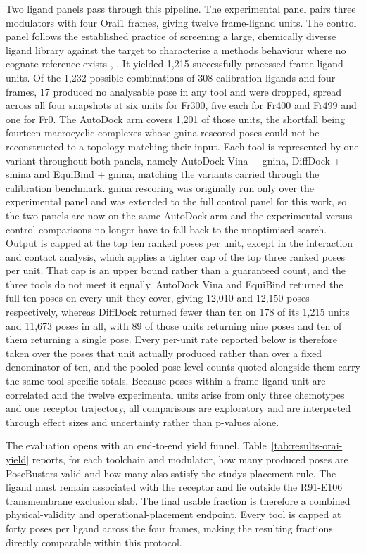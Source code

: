 Two ligand panels pass through this pipeline. The experimental panel pairs three modulators with four Orai1 frames, giving twelve frame-ligand units. The control panel follows the established practice of screening a large, chemically diverse ligand library against the target to characterise a method\textquotesingle s behaviour where no cognate reference exists \cite{ref045}, \cite{ref046}. It yielded 1,215 successfully processed frame-ligand units. Of the 1,232 possible combinations of 308 calibration ligands and four frames, 17 produced no analysable pose in any tool and were dropped, spread across all four snapshots at six units for Fr300, five each for Fr400 and Fr499 and one for Fr0. The AutoDock arm covers 1,201 of those units, the shortfall being fourteen macrocyclic complexes whose gnina-rescored poses could not be reconstructed to a topology matching their input. Each tool is represented by one variant throughout both panels, namely AutoDock Vina + gnina, DiffDock + smina and EquiBind + gnina, matching the variants carried through the calibration benchmark. gnina rescoring was originally run only over the experimental panel and was extended to the full control panel for this work, so the two panels are now on the same AutoDock arm and the experimental-versus-control comparisons no longer have to fall back to the unoptimised search. Output is capped at the top ten ranked poses per unit, except in the interaction and contact analysis, which applies a tighter cap of the top three ranked poses per unit. That cap is an upper bound rather than a guaranteed count, and the three tools do not meet it equally. AutoDock Vina and EquiBind returned the full ten poses on every unit they cover, giving 12,010 and 12,150 poses respectively, whereas DiffDock returned fewer than ten on 178 of its 1,215 units and 11,673 poses in all, with 89 of those units returning nine poses and ten of them returning a single pose. Every per-unit rate reported below is therefore taken over the poses that unit actually produced rather than over a fixed denominator of ten, and the pooled pose-level counts quoted alongside them carry the same tool-specific totals. Because poses within a frame-ligand unit are correlated and the twelve experimental units arise from only three chemotypes and one receptor trajectory, all comparisons are exploratory and are interpreted through effect sizes and uncertainty rather than p-values alone.

The evaluation opens with an end-to-end yield funnel. Table~\ref{tab:results-orai-yield} reports, for each toolchain and modulator, how many produced poses are PoseBusters-valid and how many also satisfy the study\textquotesingle s placement rule. The ligand must remain associated with the receptor and lie outside the R91-E106 transmembrane exclusion slab. The final usable fraction is therefore a combined physical-validity and operational-placement endpoint. Every tool is capped at forty poses per ligand across the four frames, making the resulting fractions directly comparable within this protocol.


